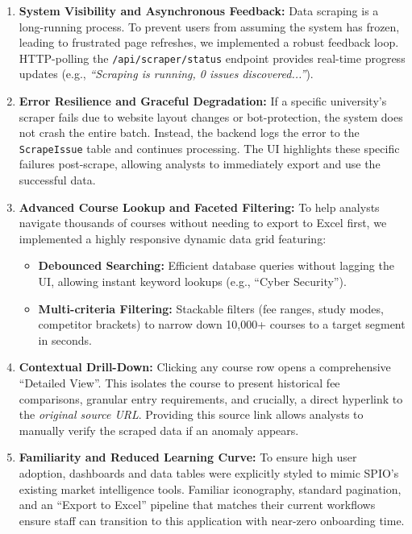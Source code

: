 \begin{enumerate}
    \item \textbf{System Visibility and Asynchronous Feedback:} Data scraping is a long-running process. To prevent users from assuming the system has frozen, leading to frustrated page refreshes, we implemented a robust feedback loop. HTTP-polling the \texttt{/api/scraper/status} endpoint provides real-time progress updates (e.g., \textit{``Scraping is running, 0 issues discovered...''}).
    
    \item \textbf{Error Resilience and Graceful Degradation:} If a specific university's scraper fails due to website layout changes or bot-protection, the system does not crash the entire batch. Instead, the backend logs the error to the \texttt{ScrapeIssue} table and continues processing. The UI highlights these specific failures post-scrape, allowing analysts to immediately export and use the successful data.
    
    \item \textbf{Advanced Course Lookup and Faceted Filtering:} To help analysts navigate thousands of courses without needing to export to Excel first, we implemented a highly responsive dynamic data grid featuring:
    \begin{itemize}
        \item \textbf{Debounced Searching:} Efficient database queries without lagging the UI, allowing instant keyword lookups (e.g., ``Cyber Security'').
        \item \textbf{Multi-criteria Filtering:} Stackable filters (fee ranges, study modes, competitor brackets) to narrow down 10,000+ courses to a target segment in seconds.
    \end{itemize}

    \item \textbf{Contextual Drill-Down:} Clicking any course row opens a comprehensive ``Detailed View''. This isolates the course to present historical fee comparisons, granular entry requirements, and crucially, a direct hyperlink to the \textit{original source URL}. Providing this source link allows analysts to manually verify the scraped data if an anomaly appears.
    
    \item \textbf{Familiarity and Reduced Learning Curve:} To ensure high user adoption, dashboards and data tables were explicitly styled to mimic SPIO's existing market intelligence tools. Familiar iconography, standard pagination, and an ``Export to Excel'' pipeline that matches their current workflows ensure staff can transition to this application with near-zero onboarding time.
\end{enumerate}